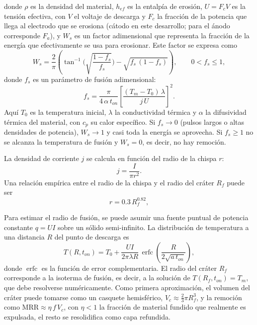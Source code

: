 donde $\rho$ es la densidad del material, $h_{ef}$ es la entalpía de erosión, $U = F_{c}V$ es la tensión efectiva, con $V$ el voltaje de descarga y $F_{c}$ la fracción de la potencia que llega al electrodo que se erosiona (cátodo en este desarrollo; para el ánodo corresponde $F_a$), y $W_{s}$ es un factor adimensional que representa la fracción de la energía que efectivamente se usa para erosionar. Este factor se expresa como
\begin{equation}
	W_{s} = \frac{2}{\pi}\left(\tan^{-1}\Big(\sqrt{\frac{1-f_{s}}{f_{s}}}\Big) - \sqrt{f_{s}\,(1-f_{s})}\right), \qquad 0 < f_s \le 1,
\end{equation}
donde $f_{s}$ es un parámetro de fusión adimensional:
\begin{equation}
	f_{s} = \frac{\pi}{4\,\alpha \,t_{on}}\left[\frac{(T_{m}-T_{0})\,\lambda}{j\,U}\right]^{2}.
\end{equation}
Aquí $T_0$ es la temperatura inicial, $\lambda$ la conductividad térmica y $\alpha$ la difusividad térmica del material, con $c_p$ su calor específico. Si $f_s \to 0$ (pulsos largos o altas densidades de potencia), $W_s \to 1$ y casi toda la energía se aprovecha. Si $f_s \ge 1$ no se alcanza la temperatura de fusión y $W_s = 0$, es decir, no hay remoción.

La densidad de corriente $j$ se calcula en función del radio de la chispa $r$:
\begin{equation}
	j = \frac{I}{\pi r^{2}}.
\end{equation}
Una relación empírica entre el radio de la chispa y el radio del cráter $R_{f}$ puede ser
\begin{equation}
	r = 0.3\,R_{f}^{0.82},
\end{equation}


Para estimar el radio de fusión, se puede asumir una fuente puntual de potencia constante $q = UI$ sobre un sólido semi-infinito. La distribución de temperatura a una distancia $R$ del punto de descarga es
\begin{equation}
	T(R,t_{on}) = T_{0} + \frac{UI}{2\pi\lambda R}\,\operatorname{erfc}\!\left(\frac{R}{2\sqrt{a\,t_{on}}}\right),
\end{equation}
donde $\operatorname{erfc}$ es la función de error complementaria. El radio del cráter $R_f$ corresponde a la isoterma de fusión, es decir, a la solución de $T(R_f,t_{on}) = T_m$, que debe resolverse numéricamente. Como primera aproximación, el volumen del cráter puede tomarse como un casquete hemisférico, $V_c \approx \tfrac{2}{3}\pi R_f^{3}$, y la remoción como $\mathrm{MRR} \approx \eta\, f\, V_c$, con $\eta<1$ la fracción de material fundido que realmente es expulsada, el resto se resolidifica como capa refundida.

